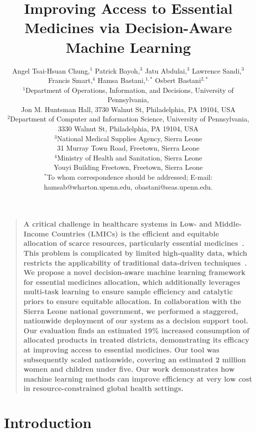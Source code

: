 \documentclass[12pt]{article}
\title{Improving Access to Essential Medicines via Decision-Aware Machine Learning}
\author{Angel Tsai-Hsuan Chung,$^{1}$ Patrick Bayoh,$^{3}$ Jatu Abdulai,$^{3}$ Lawrence Sandi,$^{3}$ Francis Smart,$^{4}$ Hamsa Bastani,$^{1,\ast}$ Osbert Bastani$^{2,\ast}$\\
\normalsize{$^{1}$Department of Operations, Information, and Decisions, University of Pennsylvania,}\\
\normalsize{Jon M. Huntsman Hall, 3730 Walnut St, Philadelphia, PA 19104, USA}\\
\normalsize{$^{2}$Department of Computer and Information Science, University of Pennsylvania,}\\
\normalsize{3330 Walnut St, Philadelphia, PA 19104, USA}\\
\normalsize{$^{3}$National Medical Supplies Agency, Sierra Leone}\\
\normalsize{31 Murray Town Road, Freetown, Sierra Leone}\\
\normalsize{$^{4}$Ministry of Health and Sanitation, Sierra Leone}\\
\normalsize{Youyi Building Freetown, Freetown, Sierra Leone}\\
\normalsize{$^\ast$To whom correspondence should be addressed; E-mail:  hamsab@wharton.upenn.edu, obastani@seas.upenn.edu.}
}
\date{}
\newenvironment{sciabstract}{
\begin{quote} \bf}
{\end{quote}}
\begin{document}
\baselineskip24pt



\maketitle



\begin{sciabstract}
A critical challenge in healthcare systems in Low- and Middle-Income Countries (LMICs) is the efficient and equitable allocation of scarce resources, particularly essential medicines~\cite{yadav2015health}. This problem is complicated by limited high-quality data, which restricts the applicability of traditional data-driven techniques~\cite{unicef2015state, gallien2021inventory,merkuryeva2019demand,yenet2023challenges}. We propose a novel decision-aware machine learning framework for essential medicines allocation, which additionally leverages multi-task learning to ensure sample efficiency and catalytic priors to ensure equitable allocation. In collaboration with the Sierra Leone national government, we performed a staggered, nationwide deployment of our system as a decision support tool. Our evaluation finds an estimated 19\% increased consumption of allocated products in treated districts, demonstrating its efficacy at improving access to essential medicines. Our tool was subsequently scaled nationwide, covering an estimated 2 million women and children under five. Our work demonstrates how machine learning methods can improve efficiency at very low cost in resource-constrained global health settings.
\end{sciabstract}

\section{Introduction}
\end{document}
